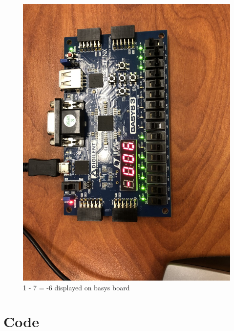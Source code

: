 \documentclass[11pt]{article}
\newcommand{\Verilog}[2][]{%
	
}
\begin{document}
\begin{figure}
	\includegraphics[width=\textwidth]{negnum.png}
	\caption{1 - 7 = -6 displayed on basys board}
	\label{fig: crap}
\end{figure}
\pagebreak

\section*{Code}

\Verilog[caption= Ncount module]{C:/Users/Spencer_stinson1/Documents/GitHub/Lab10/Lab_10/Lab_10.srcs/sources_1/new/Ncount.sv}
\Verilog[caption= Show 2's compliment module]{C:/Users/Spencer_stinson1/Documents/GitHub/Lab10/Lab_10/Lab_10.srcs/sources_1/new/show2c.sv}
\Verilog[caption=wrapper testing 
 module]{C:/Users/Spencer_stinson1/Documents/GitHub/Lab10/Lab_10/Lab_10.srcs/sources_1/new/wrapper.sv}
\Verilog[caption= calculator final module]{C:/Users/Spencer_stinson1/Documents/GitHub/Lab10/Lab_10/Lab_10.srcs/sources_1/new/calc.sv}

\Verilog[caption= Ncount test bench module]{C:/Users/Spencer_stinson1/Documents/GitHub/Lab10/Lab_10/Lab_10.srcs/sim_1/new/Ncount_testbench.sv}
\Verilog[caption= show2c test bench  module]{C:/Users/Spencer_stinson1/Documents/GitHub/Lab10/Lab_10/Lab_10.srcs/sim_1/new/show2c_testbench.sv}
\end{document}
